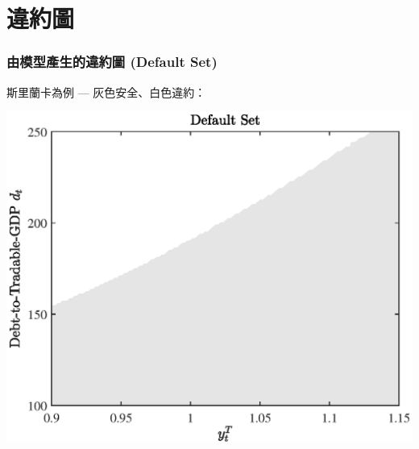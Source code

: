 \documentclass[mathserif]{beamer}
\begin{document}

    \section{違約圖}
    \begin{frame}
        \frametitle{由模型產生的違約圖 (Default Set)}
        斯里蘭卡為例 --- 灰色安全、白色違約：
        \begin{center}
        \includegraphics[height = 0.8\textheight]{fig/default_set_sri_trad_hp.eps}
        \end{center}
    \end{frame}
\end{document}
